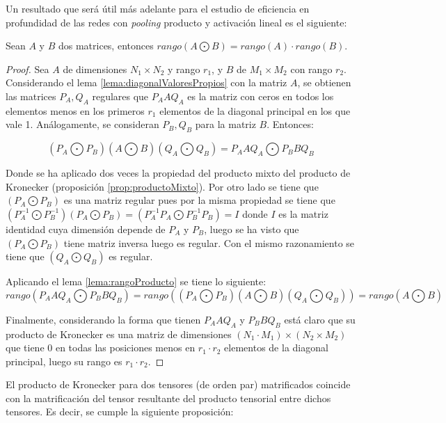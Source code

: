Un resultado que será útil más adelante para el estudio de eficiencia en profundidad de las redes con \textit{pooling} producto y activación lineal es el siguiente:

\begin{lema} \label{lema:rangokronecker}
Sean $A$ y $B$ dos matrices, entonces $\textit{rango}(A\bigodot B) = \textit{rango}(A) \cdot \textit{rango}(B)$. 
\end{lema}
\begin{proof}
Sea $A$ de dimensiones $N_1\times N_2$ y rango $r_1$, y $B$ de $M_1 \times M_2$ con rango $r_2$. Considerando el lema \ref{lema:diagonalValoresPropios} con la matriz $A$, se obtienen las matrices $P_A,Q_A$ regulares que $P_AAQ_A$ es la matriz con ceros en todos los elementos menos en los primeros $r_1$ elementos de la diagonal principal en los que vale 1. Análogamente, se consideran $P_B,Q_B$ para la matriz $B$. Entonces:

$$
(P_A\bigodot P_B)(A\bigodot B)(Q_A\bigodot Q_B) = P_AAQ_A\bigodot P_BBQ_B
$$

Donde se ha aplicado dos veces la propiedad del producto mixto del producto de Kronecker (proposición \ref{prop:productoMixto}). Por otro lado se tiene que $(P_A\bigodot P_B)$ es una matriz regular pues por la misma propiedad se tiene que $(P_A^{-1} \bigodot P_B^{-1})(P_A\bigodot P_B) = (P_A^{-1}P_A \bigodot P_B^{-1}P_B) = I$ donde $I$ es la matriz identidad cuya dimensión depende de $P_A$ y $P_B$, luego se ha visto que $(P_A\bigodot P_B)$ tiene matriz inversa luego es regular. Con el mismo razonamiento se tiene que $(Q_A\bigodot Q_B)$ es regular. 

Aplicando el lema \ref{lema:rangoProducto} se tiene lo siguiente:
$$
\textit{rango}(P_AAQ_A\bigodot P_BBQ_B) = \textit{rango}((P_A\bigodot P_B)(A\bigodot B)(Q_A\bigodot Q_B)) = \textit{rango}(A\bigodot B)
$$

Finalmente, considerando la forma que tienen $P_AAQ_A$ y $P_BBQ_B$ está claro que su producto de Kronecker es una matriz de dimensiones $(N_1 \cdot M_1) \times (N_2 \times M_2)$ que tiene $0$ en todas las posiciones menos en $r_1\cdot r_2$ elementos de la diagonal principal, luego su rango es $r_1\cdot r_2$.
\end{proof}


El producto de Kronecker para dos tensores (de orden par) matrificados coincide con la matrificación del tensor resultante del producto tensorial entre dichos tensores. Es decir, se cumple la siguiente proposición:

